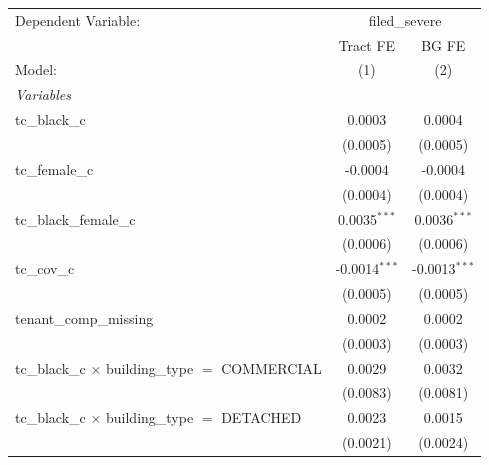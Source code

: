 \begin{tabular}{lcc}
   \tabularnewline \midrule \midrule
   Dependent Variable: & \multicolumn{2}{c}{filed\_severe}\\
                                                                       & Tract FE               & BG FE \\   
   Model:                                                              & (1)                    & (2)\\  
   \midrule
   \emph{Variables}\\
   tc\_black\_c                                                        & 0.0003                 & 0.0004\\   
                                                                       & (0.0005)               & (0.0005)\\   
   tc\_female\_c                                                       & -0.0004                & -0.0004\\   
                                                                       & (0.0004)               & (0.0004)\\   
   tc\_black\_female\_c                                                & 0.0035$^{***}$         & 0.0036$^{***}$\\   
                                                                       & (0.0006)               & (0.0006)\\   
   tc\_cov\_c                                                          & -0.0014$^{***}$        & -0.0013$^{***}$\\   
                                                                       & (0.0005)               & (0.0005)\\   
   tenant\_comp\_missing                                               & 0.0002                 & 0.0002\\   
                                                                       & (0.0003)               & (0.0003)\\   
   tc\_black\_c $\times$ building\_type $=$ COMMERCIAL                 & 0.0029                 & 0.0032\\   
                                                                       & (0.0083)               & (0.0081)\\   
   tc\_black\_c $\times$ building\_type $=$ DETACHED                   & 0.0023                 & 0.0015\\   
                                                                       & (0.0021)               & (0.0024)\\   

\end{tabular}
